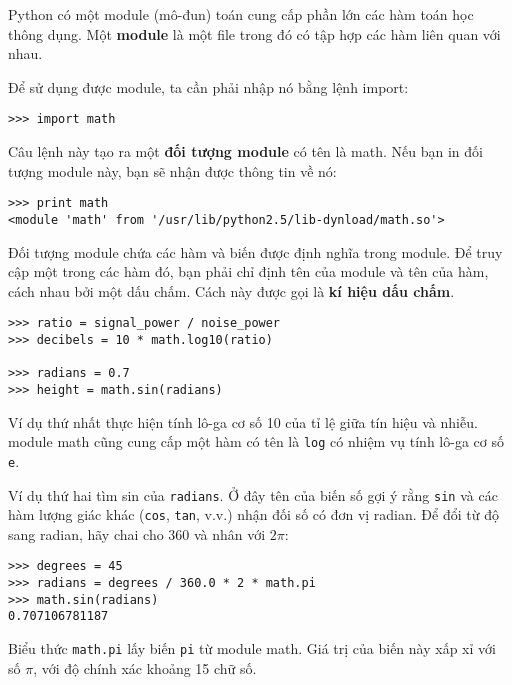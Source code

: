 \documentclass[11pt]{book}
\begin{document}
Python có một module (mô-đun) toán cung cấp phần lớn các hàm toán học
thông dụng. Một {\bf module} là một file 
trong đó có tập hợp các hàm liên quan với nhau.


Để sử dụng được module, ta cần phải nhập nó bằng lệnh import:

\beforeverb
\begin{verbatim}
>>> import math
\end{verbatim}
\afterverb
%
Câu lệnh này tạo ra một {\bf đối tượng module} có tên là math.
Nếu bạn in đối tượng module này, bạn sẽ nhận được thông tin về nó:

\beforeverb
\begin{verbatim}
>>> print math
<module 'math' from '/usr/lib/python2.5/lib-dynload/math.so'>
\end{verbatim}
\afterverb
%
Đối tượng module chứa các hàm và biến được định nghĩa trong module.
Để truy cập một trong các hàm đó, bạn phải chỉ định tên của module và
tên của hàm, cách nhau bởi một dấu chấm. Cách này được gọi là
{\bf kí hiệu dấu chấm}.


\beforeverb
\begin{verbatim}
>>> ratio = signal_power / noise_power
>>> decibels = 10 * math.log10(ratio)

>>> radians = 0.7
>>> height = math.sin(radians)
\end{verbatim}
\afterverb
%
Ví dụ thứ nhất thực hiện tính lô-ga cơ số 10 của tỉ lệ giữa
tín hiệu và nhiễu. module math cũng cung cấp một hàm có tên
là {\tt log} có nhiệm vụ tính lô-ga cơ số {\tt e}. 


Ví dụ thứ hai tìm sin của {\tt radians}. Ở đây tên của biến số
gợi ý rằng {\tt sin} và các hàm lượng giác khác ({\tt cos}, 
{\tt tan}, v.v.) nhận đối số có đơn vị radian. Để đổi từ độ
sang radian, hãy chai cho 360 và nhân với $2\pi$:

\beforeverb
\begin{verbatim}
>>> degrees = 45
>>> radians = degrees / 360.0 * 2 * math.pi
>>> math.sin(radians)
0.707106781187
\end{verbatim}
\afterverb
%
Biểu thức {\tt math.pi} lấy biến {\tt pi} từ module math.
Giá trị của biến này xấp xỉ với số $\pi$, với độ chính xác
khoảng 15 chữ số.

\end{document}
